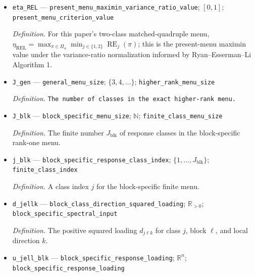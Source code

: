 \documentclass{article}
\begin{document}
\begin{itemize}
  \item \texttt{eta\_\allowbreak{}REL} --- \texttt{present\_\allowbreak{}menu\_\allowbreak{}maximin\_\allowbreak{}variance\_\allowbreak{}ratio\_\allowbreak{}value}; \([0,1]\); \texttt{present\_\allowbreak{}menu\_\allowbreak{}criterion\_\allowbreak{}value}
  \par\smallskip\noindent\emph{Definition.} For this paper's two-class matched-quadruple menu, \(\eta_{\mathrm{REL}}=\max_{\pi\in\Pi_n}\min_{j\in\{1,2\}}\operatorname{RE}_j(\pi)\); this is the present-menu maximin value under the variance-ratio normalization informed by Ryan--Esserman--Li Algorithm 1.
  \item \texttt{J\_\allowbreak{}gen} --- \texttt{general\_\allowbreak{}menu\_\allowbreak{}size}; \(\{3,4,\ldots\}\); \texttt{higher\_\allowbreak{}rank\_\allowbreak{}menu\_\allowbreak{}size}
  \par\smallskip\noindent\emph{Definition.} \texttt{The number of classes in the exact higher-\allowbreak{}rank menu.}
  \item \texttt{J\_\allowbreak{}blk} --- \texttt{block\_\allowbreak{}specific\_\allowbreak{}menu\_\allowbreak{}size}; \(\mathbb N\); \texttt{finite\_\allowbreak{}class\_\allowbreak{}menu\_\allowbreak{}size}
  \par\smallskip\noindent\emph{Definition.} The finite number \(J_{\mathrm{blk}}\) of response classes in the block-specific rank-one menu.
  \item \texttt{j\_\allowbreak{}blk} --- \texttt{block\_\allowbreak{}specific\_\allowbreak{}response\_\allowbreak{}class\_\allowbreak{}index}; \(\{1,\ldots,J_{\mathrm{blk}}\}\); \texttt{finite\_\allowbreak{}class\_\allowbreak{}index}
  \par\smallskip\noindent\emph{Definition.} A class index \(j\) for the block-specific finite menu.
  \item \texttt{d\_\allowbreak{}jellk} --- \texttt{block\_\allowbreak{}class\_\allowbreak{}direction\_\allowbreak{}squared\_\allowbreak{}loading}; \(\mathbb R_{>0}\); \texttt{block\_\allowbreak{}specific\_\allowbreak{}spectral\_\allowbreak{}input}
  \par\smallskip\noindent\emph{Definition.} The positive squared loading \(d_{j\ell k}\) for class \(j\), block \(\ell\), and local direction \(k\).
  \item \texttt{u\_\allowbreak{}jell\_\allowbreak{}blk} --- \texttt{block\_\allowbreak{}specific\_\allowbreak{}response\_\allowbreak{}loading}; \(\mathbb R^n\); \texttt{block\_\allowbreak{}specific\_\allowbreak{}response\_\allowbreak{}loading}

\end{itemize}
\end{document}
